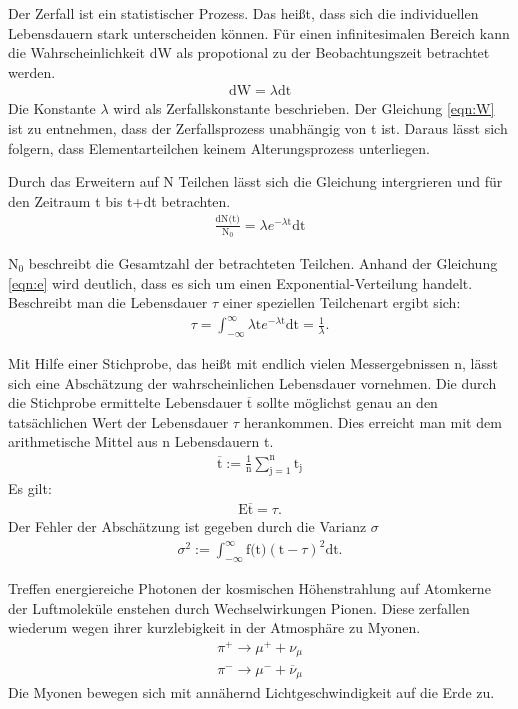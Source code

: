 Der Zerfall ist ein statistischer Prozess. Das heißt, dass sich die individuellen Lebensdauern stark unterscheiden können.
Für einen infinitesimalen Bereich kann die Wahrscheinlichkeit dW als propotional zu der Beobachtungszeit betrachtet werden.
\begin{align}
  \text{dW}=\lambda \text{dt}
  \label{eqn:W}
\end{align}
Die Konstante $\lambda$ wird als Zerfallskonstante beschrieben.
Der Gleichung \ref{eqn:W} ist zu entnehmen, dass der Zerfallsprozess unabhängig von t ist.
Daraus lässt sich folgern, dass Elementarteilchen keinem Alterungsprozess unterliegen.

Durch das Erweitern auf N Teilchen lässt sich die Gleichung intergrieren und für den Zeitraum t bis t+dt betrachten.
\begin{align}
  \frac{\text{dN(t)}}{\text{N}_0}=\lambda e^{-\lambda \text{t}} \text{dt}
  \label{eqn:e}
\end{align}



$\text{N}_0$ beschreibt die Gesamtzahl der betrachteten Teilchen.
Anhand der Gleichung \ref{eqn:e} wird deutlich, dass es sich um einen Exponential-Verteilung handelt.
Beschreibt man die Lebensdauer $\tau$ einer speziellen Teilchenart ergibt sich:
\begin{align*}
  \tau=\int_{-\infty}^{\infty}\lambda \text{t} e^{-\lambda \text{t}}\text{dt}=\frac{1}{\lambda}.
\end{align*}

Mit Hilfe einer Stichprobe, das heißt mit endlich vielen Messergebnissen n, lässt sich eine Abschätzung der wahrscheinlichen Lebensdauer vornehmen.
Die durch die Stichprobe ermittelte Lebensdauer $\overline{\text{t}}$ sollte möglichst genau an den tatsächlichen Wert der Lebensdauer $\tau$ herankommen.
Dies erreicht man mit dem arithmetische Mittel aus n Lebensdauern t.
\begin{align*}
  \overline{\text{t}}:=\frac{1}{\text{n}}\sum_{\text{j}=1}^\text{n}\text{t}_\text{j}
\end{align*}
Es gilt:
\begin{align*}
  \text{E}\overline{\text{t}}=\tau.
\end{align*}
Der Fehler der Abschätzung ist gegeben durch die Varianz $\sigma$
\begin{align*}
  \sigma^2:=\int_{-\infty}^{\infty}\text{f(t)}(\text{t}-\tau)^2\text{dt}.
\end{align*}


Treffen energiereiche Photonen der kosmischen Höhenstrahlung auf Atomkerne der Luftmoleküle enstehen durch Wechselwirkungen
Pionen.
Diese zerfallen wiederum wegen ihrer kurzlebigkeit in der Atmosphäre zu Myonen.
\begin{align*}
  \pi^+ \rightarrow \mu^++\nu_\mu\\
  \pi^- \rightarrow \mu^-+\overline{\nu}_\mu
\end{align*}
Die Myonen bewegen sich mit annähernd Lichtgeschwindigkeit auf die Erde zu.

